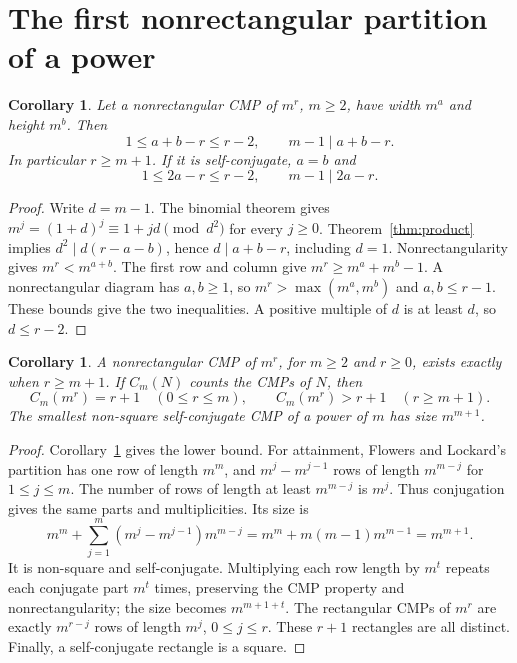 \documentclass[11pt]{article}
\newtheorem{corollary}[theorem]{Corollary}
\begin{document}
\section{The first nonrectangular partition of a power}
\begin{corollary}\label{cor:defect}
Let a nonrectangular CMP of $m^r$, $m\geq2$, have width $m^a$
and height $m^b$. Then
\[
 1\leq a+b-r\leq r-2,\qquad m-1\mid a+b-r.
\]
In particular $r\geq m+1$. If it is self-conjugate, $a=b$ and
\begin{equation}\label{eq:defect}
 1\leq 2a-r\leq r-2,\qquad m-1\mid 2a-r.
\end{equation}
\end{corollary}
\begin{proof}
Write $d=m-1$. The binomial theorem gives
$m^j=(1+d)^j\equiv1+jd\pmod{d^2}$ for every $j\geq0$.
Theorem~\ref{thm:product} implies $d^2\mid d(r-a-b)$, hence
$d\mid a+b-r$, including $d=1$.
Nonrectangularity gives $m^r<m^{a+b}$.
The first row and column give $m^r\geq m^a+m^b-1$.
A nonrectangular diagram has $a,b\geq1$, so
$m^r>\max(m^a,m^b)$ and $a,b\leq r-1$.
These bounds give the two inequalities. A positive multiple of $d$
is at least $d$, so $d\leq r-2$.
\end{proof}

\begin{corollary}\label{cor:rectangles}
A nonrectangular CMP of $m^r$, for $m\geq2$ and $r\geq0$, exists
exactly when $r\geq m+1$. If $C_m(N)$ counts the CMPs of $N$, then
\[
 C_m(m^r)=r+1\quad(0\leq r\leq m),\qquad
 C_m(m^r)>r+1\quad(r\geq m+1).
\]
The smallest non-square self-conjugate CMP of a power of $m$ has size
$m^{m+1}$.
\end{corollary}
\begin{proof}
Corollary~\ref{cor:defect} gives the lower bound.
For attainment, Flowers and Lockard's partition
\cite[Lemma~4.2, p.~467]{FL} has one row of length $m^m$, and
$m^j-m^{j-1}$ rows of length $m^{m-j}$ for $1\leq j\leq m$.
The number of rows of length at least $m^{m-j}$ is $m^j$.
Thus conjugation gives the same parts and multiplicities. Its size is
\[
 m^m+\sum_{j=1}^m(m^j-m^{j-1})m^{m-j}
 =m^m+m(m-1)m^{m-1}=m^{m+1}.
\]
It is non-square and self-conjugate.
Multiplying each row length by $m^t$ repeats each conjugate part
$m^t$ times, preserving the CMP property and nonrectangularity;
the size becomes $m^{m+1+t}$.
The rectangular CMPs of $m^r$ are exactly $m^{r-j}$ rows of length
$m^j$, $0\leq j\leq r$. These $r+1$ rectangles are all distinct.
Finally, a self-conjugate rectangle is a square.
\end{proof}
\end{document}
